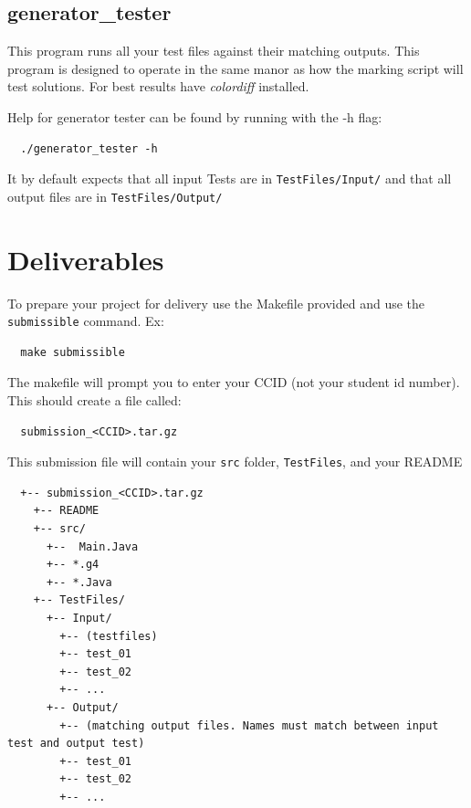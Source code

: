 \documentclass{article}
\begin{document}
\subsection{generator\_tester}
This program runs all your test files against their matching outputs. This program is designed to operate in the
same manor as how the marking script will test solutions. For best results have \textit{colordiff} installed.

Help for generator tester can be found by running with the -h flag:
\begin{lstlisting}
  ./generator_tester -h
\end{lstlisting}

It by default expects that all input Tests are in \texttt{TestFiles/Input/} and that  all output files are in
\texttt{TestFiles/Output/}

\section{Deliverables}
To prepare your project for delivery use the Makefile provided and use the \texttt{submissible} command. Ex:
\begin{lstlisting}
  make submissible
\end{lstlisting}

The makefile will prompt you to enter your CCID (not your student id number). This should create a file called:
\begin{lstlisting}
  submission_<CCID>.tar.gz
\end{lstlisting}

This submission file will contain your \texttt{src} folder, \texttt{TestFiles}, and your README
\begin{lstlisting}
  +-- submission_<CCID>.tar.gz
    +-- README
    +-- src/
      +--  Main.Java
      +-- *.g4
      +-- *.Java
    +-- TestFiles/
      +-- Input/
        +-- (testfiles)
        +-- test_01
        +-- test_02
        +-- ...
      +-- Output/
        +-- (matching output files. Names must match between input test and output test)
        +-- test_01
        +-- test_02
        +-- ...
\end{lstlisting}
\end{document}
